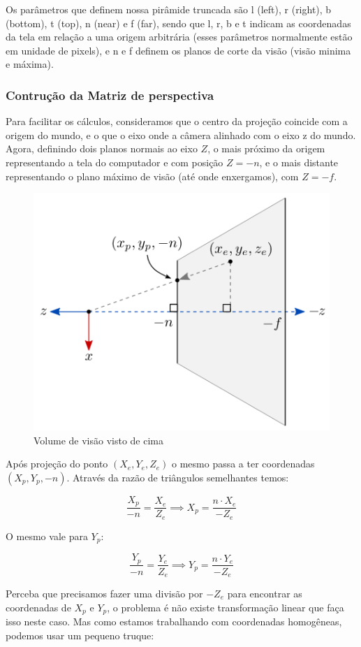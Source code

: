 \documentclass[12pt]{article}
\begin{document}
Os parâmetros que definem nossa pirâmide truncada são l (left), r (right), b (bottom), t (top), n (near) e f (far), sendo que l, r, b e t indicam as coordenadas da tela em relação a uma origem arbitrária (esses parâmetros normalmente estão em unidade de pixels), e n e f definem os planos de corte da visão (visão minima e máxima).

\subsubsection{Contrução da Matriz de perspectiva}

Para facilitar os cálculos, consideramos que o centro da projeção coincide com a origem do mundo, e o que o eixo onde a câmera alinhado com o eixo z do mundo.
Agora, definindo dois planos normais ao eixo $Z$, o mais próximo da origem representando a tela do computador e com posição $Z = -n$, e o mais distante representando o plano máximo de visão (até onde enxergamos), com $Z = -f$.

\begin{figure}[H]
    \centering
    \includegraphics[width=0.6\linewidth]{imgs/projection02.png}
    \caption{Volume de visão visto de cima}
\end{figure} 


Após projeção do ponto $(X_e,Y_e,Z_e)$ o mesmo passa a ter coordenadas $(X_p, Y_p, -n)$. Através da razão de triângulos semelhantes temos:

\[
\frac{X_p}{-n} = \frac{X_e}{Z_e} \implies X_p = \frac{n \cdot X_e}{-Z_e}
\]

O mesmo vale para $Y_p$:

\[
\frac{Y_p}{-n} = \frac{Y_e}{Z_e} \implies Y_p = \frac{n \cdot Y_e}{-Z_e}
\]

Perceba que precisamos fazer uma divisão por $-Z_e$ para encontrar as coordenadas de $X_p$ e $Y_p$, o problema é não existe transformação linear que faça isso neste caso. Mas como estamos trabalhando com coordenadas homogêneas, podemos usar um pequeno truque:
\end{document}
